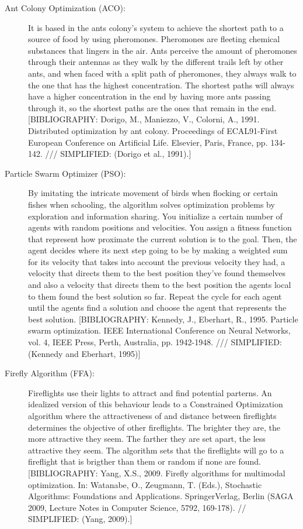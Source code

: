 \begin{description}
\item[Ant Colony Optimization (ACO):] It is based in the ants colony's system to achieve the shortest path to a source of food by using pheromones. Pheromones are fleeting chemical substances that lingers in the air. Ants perceive the amount of pheromones through their antennas as they walk by the different trails left by other ants, and when faced with a split path of pheromones, they always walk to the one that has the highest concentration. The shortest paths will always have a higher concentration in the end by having more ants passing through it, so the shortest paths are the ones that remain in the end. [BIBLIOGRAPHY: Dorigo, M., Maniezzo, V., Colorni, A., 1991. Distributed optimization by ant colony. Proceedings of ECAL91-First European Conference on Artificial Life. Elsevier, Paris, France, pp. 134-142. /// SIMPLIFIED: (Dorigo et al., 1991).]

\item[Particle Swarm Optimizer (PSO):] By imitating the intricate movement of birds when flocking or certain fishes when schooling, the algorithm solves optimization problems by exploration and information sharing. You initialize a certain number of agents with random positions and velocities. You assign a fitness function that represent how proximate the current solution is to the goal. Then, the agent decides where its next step going to be by making a weighted sum for its velocity that takes into account the previous velocity they had, a velocity that directs them to the best position they've found themselves and also a velocity that directs them to the best position the agents local to them found the best solution so far. Repeat the cycle for each agent until the agents find a solution and choose the agent that represents the best solution. [BIBLIOGRAPHY: Kennedy, J., Eberhart, R., 1995. Particle swarm optimization. IEEE International Conference on Neural Networks, vol. 4, IEEE Press, Perth, Australia, pp. 1942-1948. /// SIMPLIFIED:  (Kennedy and Eberhart, 1995)]

\item[Firefly Algorithm (FFA):] Fireflights use their lights to attract and find potential parterns. An idealized version of this behaviour leads to a Constrained Optimization algorithm where the attractiveness of and distance between fireflights determines the objective of other fireflights. The brighter they are, the more attractive they seem. The farther they are set apart, the less attractive they seem. The algorithm sets that the fireflights will go to a fireflight that is brigther than them or random if none are found. [BIBLIOGRAPHY: Yang, X.S., 2009. Firefly algorithms for multimodal optimization. In: Watanabe, O., Zeugmann, T. (Eds.), Stochastic Algorithms: Foundations and Applications. SpringerVerlag, Berlin (SAGA 2009, Lecture Notes in Computer Science, 5792, 169-178). // SIMPLIFIED: (Yang, 2009).]


\end{description}
